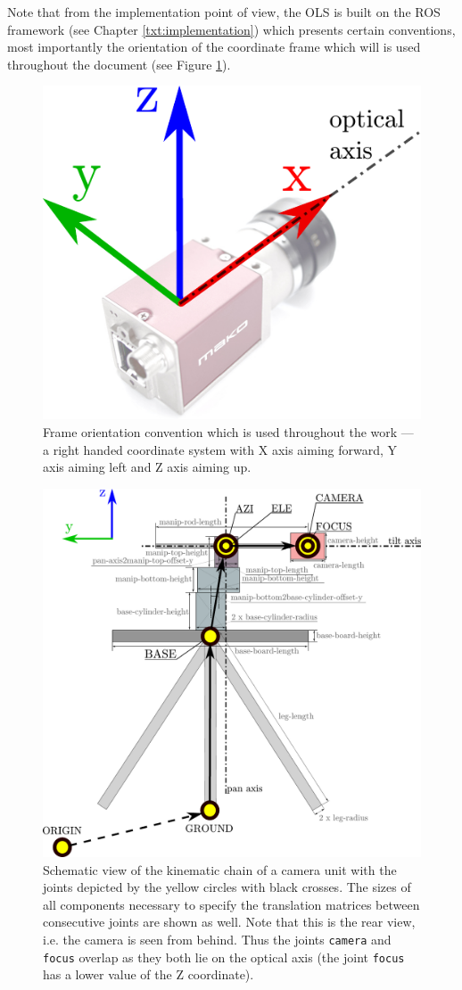 Note that from the implementation point of view, the OLS is built on the ROS framework (see Chapter \ref{txt:implementation}) which presents certain conventions, most importantly the orientation of the coordinate frame which will is used throughout the document (see Figure \ref{fig:frame_convention}).

\begin{figure}[htb]
	\centering
	\includegraphics[width=0.2\linewidth]{fig/frame_convention.pdf}
	\caption{Frame orientation convention which is used throughout the work --- a right handed coordinate system with X axis aiming forward, Y axis aiming left and Z axis aiming up.}
	\label{fig:frame_convention}
\end{figure}

\begin{figure}[htb]
	\centering
	\includegraphics[width=0.6\linewidth]{fig/camera_unit_kinematic_chain.pdf}
	\caption{Schematic view of the kinematic chain of a camera unit with the joints depicted by the yellow circles with black crosses. The sizes of all components necessary to specify the translation matrices between consecutive joints are shown as well. Note that this is the rear view, i.e. the camera is seen from behind. Thus the joints \texttt{camera} and \texttt{focus} overlap as they both lie on the optical axis (the joint \texttt{focus} has a lower value of the Z coordinate).}
	\label{fig:camera_unit_kinematic_chain}
\end{figure}


